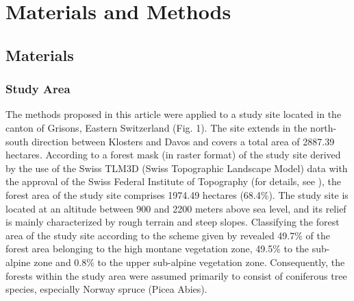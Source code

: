 
\section{Materials and Methods}
\label{sec:Meth}



\subsection{Materials}
\label{sec:mat}

\subsubsection{Study Area}
\label{sec:studarea}

The methods proposed in this article were applied to a study site located in the canton of Grisons, Eastern Switzerland (Fig. 1). The site extends in the north-south direction between Klosters and Davos and covers a total area of 2887.39 hectares. According to a forest mask (in raster format) of the study site derived by the use of the Swiss TLM3D (Swiss Topographic Landscape Model) data with the approval of the Swiss Federal Institute of Topography (for details, see \citet{hill2013}), the forest area of the study site comprises 1974.49 hectares (68.4\%). The study site is located at an altitude between 900 and 2200 meters above sea level, and its relief is mainly characterized by rough terrain and steep slopes. Classifying the forest area of the study site according to the scheme given by \citep{ott1997} revealed 49.7\% of the forest area belonging to the high montane vegetation  zone, 49.5\% to the sub-alpine zone and 0.8\% to the upper sub-alpine vegetation zone. Consequently, the forests within the study area were assumed primarily to consist of coniferous tree species, especially Norway spruce (Picea Abies).

